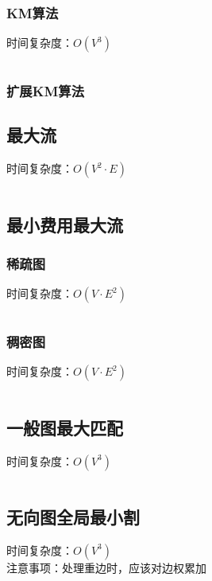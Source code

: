 \documentclass[a4paper]{article}
\newcommand{\cppcode}[1]{
    \inputminted[mathescape]{cpp}{source/#1}
}
\begin{document}
\subsubsection{KM算法}

时间复杂度：$O(V^3)$

\cppcode{graph-theory/maximum-weight-matching.cpp}

\subsubsection{扩展KM算法}

\subsection{最大流}

时间复杂度：$O(V^2 \cdot E)$

\cppcode{graph-theory/maximum-flow.cpp}

\subsection{最小费用最大流}

\subsubsection{稀疏图}

时间复杂度：$O(V \cdot E^2)$

\cppcode{graph-theory/minimum-cost-flow-spfa.cpp}

\subsubsection{稠密图}

时间复杂度：$O(V \cdot E^2)$

\cppcode{graph-theory/minimum-cost-flow-zkw.cpp}

\subsection{一般图最大匹配}

时间复杂度：$O(V^3)$

\cppcode{graph-theory/maximum-matching-blossom.cpp}

\subsection{无向图全局最小割}

时间复杂度：$O(V^3)$\\
\indent 注意事项：处理重边时，应该对边权累加
\end{document}

